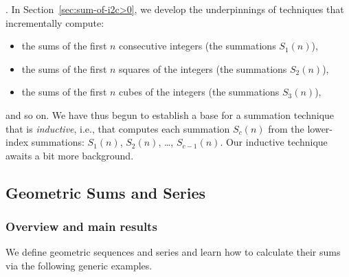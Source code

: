 %

\bigskip

.
In Section~\ref{sec:sum-of-i2c>0}, we develop the underpinnings of
techniques that incrementally compute:
\begin{itemize}
\item
the sums of the first $n$ consecutive integers (the summations $S_1(n)$), 
\medskip\item
the sums of the first $n$ squares of the integers (the summations $S_2(n)$), 
\medskip\item
the sums of the first $n$ cubes of the integers (the summations $S_3(n)$),
\end{itemize}
and so on.  We have thus begun to establish a base for a summation technique that is {\em inductive}, i.e., that computes each summation $S_c(n)$ from the lower-index summations: $S_1(n)$, $S_2(n)$, \ldots, $S_{c-1}(n)$.  Our inductive technique awaits a bit more background.


\subsection{Geometric Sums and Series}
\label{sec:general-geometric-series}
\label{sec:geometric-sums}
\label{sec:general-geometric-sums}

\subsubsection{Overview and main results}

We define geometric sequences and series and learn how to calculate their sums via the following generic examples.

